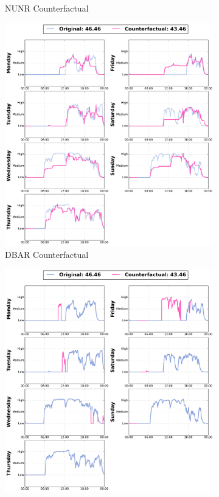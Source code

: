 \begin{figure}[t]
\begin{subfigure}[b]{0.24\textwidth}
         \caption{NUNR Counterfactual}
         \label{fig:cf:nun}
     \end{subfigure}
     \hfill
     \begin{subfigure}[b]{0.24\textwidth}
         \centering
         \includegraphics[width=\textwidth]{images/6306/1_6306_TCN_DBA_cf.pdf}
         \caption{DBAR Counterfactual}
         \label{fig:cf:dba}
     \end{subfigure}
    \hfill
     \begin{subfigure}[b]{0.24\textwidth}
         \centering
         \includegraphics[width=\textwidth]{images/6306/2_6306_TCN_TSEvo_cf.pdf}

\end{subfigure}
\end{figure}
